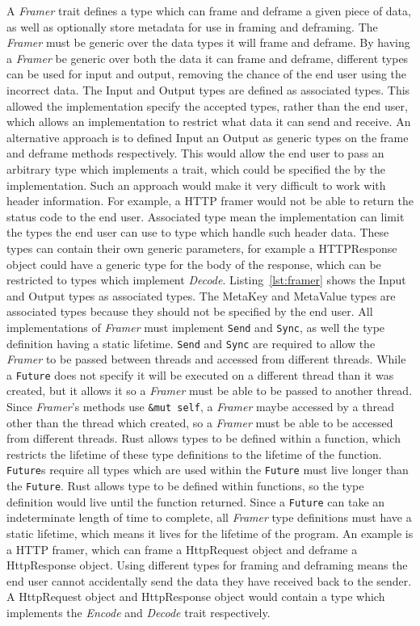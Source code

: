 A \emph{Framer} trait defines a type which can frame and deframe a given piece of data, as well as optionally store
metadata for use in framing and deframing.
The \emph{Framer} must be generic over the data types it will frame and deframe.
By having a \emph{Framer} be generic over both the data it can frame and deframe, different types can be used for input
and output, removing the chance of the end user using the incorrect data.
The Input and Output types are defined as associated types.
This allowed the implementation specify the accepted types, rather than the end user, which allows an implementation to
restrict what data it can send and receive.
An alternative approach is to defined Input an Output as generic types on the frame and deframe methods respectively.
This would allow the end user to pass an arbitrary type which implements a trait, which could be specified the by
the implementation.
Such an approach would make it very difficult to work with header information.
For example, a HTTP framer would not be able to return the status code to the end user.
Associated type mean the implementation can limit the types the end user can use to type which handle such header data.
These types can contain their own generic parameters, for example a HTTPResponse object could have a generic type for
the body of the response, which can be restricted to types which implement \emph{Decode}.
Listing~\ref{lst:framer} shows the Input and Output types as associated types.
The MetaKey and MetaValue types are associated types because they should not be specified by the end user.
All implementations of \emph{Framer} must implement \texttt{Send} and \texttt{Sync}, as well the type definition having
a static lifetime.
\texttt{Send} and \texttt{Sync} are required to allow the \emph{Framer} to be passed between threads and accessed from
different threads.
While a \texttt{Future} does not specify it will be executed on a different thread than it was created, but it allows
it so a \emph{Framer} must be able to be passed to another thread.
Since \emph{Framer}'s methods use \texttt{&mut self}, a \emph{Framer} maybe accessed by a thread other than the thread
which created, so a \emph{Framer} must be able to be accessed from different threads.
Rust allows types to be defined within a function, which restricts the lifetime of these type definitions to the
lifetime of the function.
\texttt{Future}s require all types which are used within the \texttt{Future} must live longer than the \texttt{Future}.
Rust allows type to be defined within functions, so the type definition would live until the function returned.
Since a \texttt{Future} can take an indeterminate length of time to complete, all \emph{Framer} type definitions must
have a static lifetime, which means it lives for the lifetime of the program.
An example is a HTTP framer, which can frame a HttpRequest object and deframe a HttpResponse object.
Using different types for framing and deframing means the end user cannot accidentally send the data they have received
back to the sender.
A HttpRequest object and HttpResponse object would contain a type which implements the \emph{Encode} and \emph{Decode}
trait respectively.

